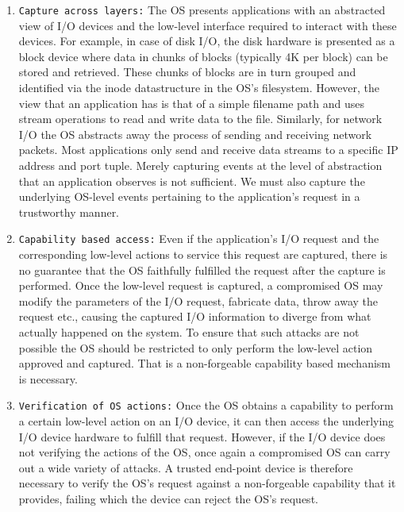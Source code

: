 \documentclass[withindex,glossary]{cam-thesis}
\begin{document}
\begin{enumerate}







\item \texttt{Capture across layers:}
The OS presents applications with an abstracted view of I/O devices and the low-level interface required to interact with these devices.
For example, in case of disk I/O, the disk hardware is presented as a block device where data in chunks of blocks (typically 4K per block) can be stored and retrieved.
These chunks of blocks are in turn grouped and identified via the inode datastructure in the OS's filesystem.
However, the view that an application has is that of a simple filename path and uses stream operations to read and write data to the file.
Similarly, for network I/O the OS abstracts away the process of sending and receiving network packets.
Most applications only send and receive data streams to a specific IP address and port tuple.
Merely capturing events at the level of abstraction that an application observes is not sufficient.
We must also capture the underlying OS-level events pertaining to the application's request in a trustworthy manner.

\item \texttt{Capability based access:}
Even if the application's I/O request and the corresponding low-level actions to service this request are captured, there is no guarantee that the OS faithfully fulfilled the request after the capture is performed.
Once the low-level request is captured, a compromised OS may modify the parameters of the I/O request, fabricate data, throw away the request etc., causing the captured I/O information to diverge from what actually happened on the system.
To ensure that such attacks are not possible the OS should be restricted to only perform the low-level action approved and captured.
That is a non-forgeable capability based mechanism is necessary.

\item \texttt{Verification of OS actions:}
Once the OS obtains a capability to perform a certain low-level action on an I/O device, it can then access the underlying I/O device hardware to fulfill that request.
However, if the I/O device does not verifying the actions of the OS, once again a compromised OS can carry out a wide variety of attacks.
A trusted end-point device is therefore necessary to verify the OS's request against a non-forgeable capability that it provides, failing which the device can reject the OS's request.

\end{enumerate}
\end{document}
